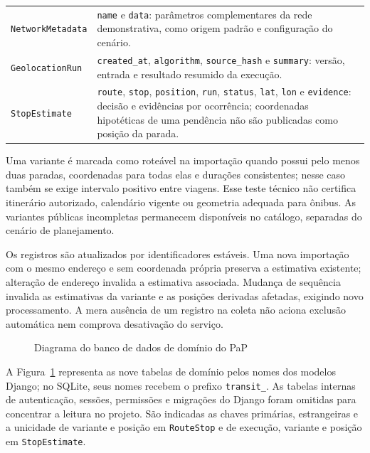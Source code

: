 \documentclass[12pt,oneside,a4paper,brazil]{abntex2}
\begin{document}
\begin{apendicesenv}
\begin{longtable}{>{\raggedright\arraybackslash}p{}>{\raggedright\arraybackslash}p{}}
\texttt{NetworkMetadata} & \texttt{name} e \texttt{data}: parâmetros complementares da rede demonstrativa, como origem padrão e configuração do cenário.\\
\texttt{GeolocationRun} & \texttt{created\_at}, \texttt{algorithm}, \texttt{source\_hash} e \texttt{summary}: versão, entrada e resultado resumido da execução.\\
\texttt{StopEstimate} & \texttt{route}, \texttt{stop}, \texttt{position}, \texttt{run}, \texttt{status}, \texttt{lat}, \texttt{lon} e \texttt{evidence}: decisão e evidências por ocorrência; coordenadas hipotéticas de uma pendência não são publicadas como posição da parada.\\
\end{longtable}
\endgroup

Uma variante é marcada como roteável na importação quando possui pelo menos duas paradas, coordenadas para todas elas e durações consistentes; nesse caso também se exige intervalo positivo entre viagens. Esse teste técnico não certifica itinerário autorizado, calendário vigente ou geometria adequada para ônibus. As variantes públicas incompletas permanecem disponíveis no catálogo, separadas do cenário de planejamento.

Os registros são atualizados por identificadores estáveis. Uma nova importação com o mesmo endereço e sem coordenada própria preserva a estimativa existente; alteração de endereço invalida a estimativa associada. Mudança de sequência invalida as estimativas da variante e as posições derivadas afetadas, exigindo novo processamento. A mera ausência de um registro na coleta não aciona exclusão automática nem comprova desativação do serviço.


\clearpage
\begin{figure}[p]
\centering
\caption{Diagrama do banco de dados de domínio do PaP}
\label{fig:banco-mbm}
\resizebox{\textwidth}{!}{}
\end{figure}
\clearpage

A Figura~\ref{fig:banco-mbm} representa as nove tabelas de domínio pelos nomes dos modelos Django; no SQLite, seus nomes recebem o prefixo \texttt{transit\_}. As tabelas internas de autenticação, sessões, permissões e migrações do Django foram omitidas para concentrar a leitura no projeto. São indicadas as chaves primárias, estrangeiras e a unicidade de variante e posição em \texttt{RouteStop} e de execução, variante e posição em \texttt{StopEstimate}.


\end{apendicesenv}
\end{document}
